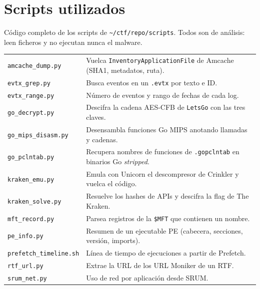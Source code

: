 \documentclass[11pt,a4paper]{article}
\begin{document}
\appendix

\clearpage
\section{Scripts utilizados}\label{ap:scripts}
Código completo de los scripts de \texttt{\textasciitilde/ctf/repo/scripts}. Todos son de análisis: leen ficheros y
no ejecutan nunca el malware.

\begin{tabularx}{\linewidth}{@{}lX@{}}
\toprule
\texttt{amcache\_dump.py} & Vuelca \texttt{InventoryApplicationFile} de Amcache (SHA1, metadatos, ruta). \\
\texttt{evtx\_grep.py} & Busca eventos en un \texttt{.evtx} por texto e ID. \\
\texttt{evtx\_range.py} & Número de eventos y rango de fechas de cada log. \\
\texttt{go\_decrypt.py} & Descifra la cadena AES-CFB de \texttt{LetsGo} con las tres claves. \\
\texttt{go\_mips\_disasm.py} & Desensambla funciones Go MIPS anotando llamadas y cadenas. \\
\texttt{go\_pclntab.py} & Recupera nombres de funciones de \texttt{.gopclntab} en binarios Go \emph{stripped}. \\
\texttt{kraken\_emu.py} & Emula con Unicorn el descompresor de Crinkler y vuelca el código. \\
\texttt{kraken\_solve.py} & Resuelve los hashes de APIs y descifra la flag de The Kraken. \\
\texttt{mft\_record.py} & Parsea registros de la \texttt{\$MFT} que contienen un nombre. \\
\texttt{pe\_info.py} & Resumen de un ejecutable PE (cabecera, secciones, versión, imports). \\
\texttt{prefetch\_timeline.sh} & Línea de tiempo de ejecuciones a partir de Prefetch. \\
\texttt{rtf\_url.py} & Extrae la URL de los URL Moniker de un RTF. \\
\texttt{srum\_net.py} & Uso de red por aplicación desde SRUM. \\
\bottomrule
\end{tabularx}
\end{document}
